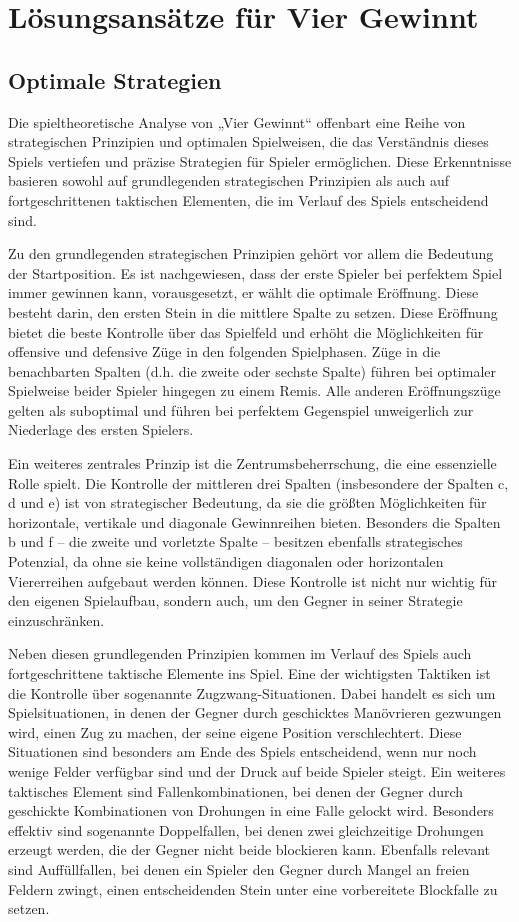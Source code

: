 \chapter{Lösungsansätze für Vier Gewinnt}

\section{Optimale Strategien}
Die spieltheoretische Analyse von „Vier Gewinnt“ offenbart eine Reihe von strategischen Prinzipien und optimalen Spielweisen, die das Verständnis dieses Spiels vertiefen und präzise Strategien für Spieler ermöglichen. Diese Erkenntnisse basieren sowohl auf grundlegenden strategischen Prinzipien als auch auf fortgeschrittenen taktischen Elementen, die im Verlauf des Spiels entscheidend sind.

Zu den grundlegenden strategischen Prinzipien gehört vor allem die Bedeutung der Startposition. Es ist nachgewiesen, dass der erste Spieler bei perfektem Spiel immer gewinnen kann, vorausgesetzt, er wählt die optimale Eröffnung. Diese besteht darin, den ersten Stein in die mittlere Spalte zu setzen. Diese Eröffnung bietet die beste Kontrolle über das Spielfeld und erhöht die Möglichkeiten für offensive und defensive Züge in den folgenden Spielphasen. Züge in die benachbarten Spalten (d.h. die zweite oder sechste Spalte) führen bei optimaler Spielweise beider Spieler hingegen zu einem Remis. Alle anderen Eröffnungszüge gelten als suboptimal und führen bei perfektem Gegenspiel unweigerlich zur Niederlage des ersten Spielers.

Ein weiteres zentrales Prinzip ist die Zentrumsbeherrschung, die eine essenzielle Rolle spielt. Die Kontrolle der mittleren drei Spalten (insbesondere der Spalten c, d und e) ist von strategischer Bedeutung, da sie die größten Möglichkeiten für horizontale, vertikale und diagonale Gewinnreihen bieten. Besonders die Spalten b und f – die zweite und vorletzte Spalte – besitzen ebenfalls strategisches Potenzial, da ohne sie keine vollständigen diagonalen oder horizontalen Viererreihen aufgebaut werden können. Diese Kontrolle ist nicht nur wichtig für den eigenen Spielaufbau, sondern auch, um den Gegner in seiner Strategie einzuschränken.

Neben diesen grundlegenden Prinzipien kommen im Verlauf des Spiels auch fortgeschrittene taktische Elemente ins Spiel. Eine der wichtigsten Taktiken ist die Kontrolle über sogenannte Zugzwang-Situationen. Dabei handelt es sich um Spielsituationen, in denen der Gegner durch geschicktes Manövrieren gezwungen wird, einen Zug zu machen, der seine eigene Position verschlechtert. Diese Situationen sind besonders am Ende des Spiels entscheidend, wenn nur noch wenige Felder verfügbar sind und der Druck auf beide Spieler steigt. Ein weiteres taktisches Element sind Fallenkombinationen, bei denen der Gegner durch geschickte Kombinationen von Drohungen in eine Falle gelockt wird. Besonders effektiv sind sogenannte Doppelfallen, bei denen zwei gleichzeitige Drohungen erzeugt werden, die der Gegner nicht beide blockieren kann. Ebenfalls relevant sind Auffüllfallen, bei denen ein Spieler den Gegner durch Mangel an freien Feldern zwingt, einen entscheidenden Stein unter eine vorbereitete Blockfalle zu setzen.

